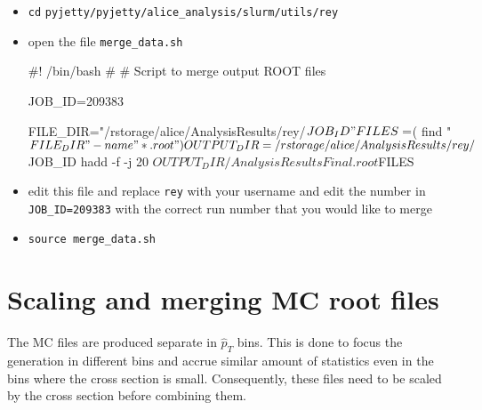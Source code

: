 \documentclass[12pt]{article}
\begin{document}
\begin{itemize}
\item \verb|cd| \verb|pyjetty/pyjetty/alice_analysis/slurm/utils/rey|
\item open the file \verb|merge_data.sh|

\begin{tcolorbox}
\begin{verbnobox}[\scriptsize]
#! /bin/bash
#
# Script to merge output ROOT files

JOB_ID=209383

FILE_DIR="/rstorage/alice/AnalysisResults/rey/$JOB_ID"
FILES=$( find "$FILE_DIR" -name "*.root" )

OUTPUT_DIR=/rstorage/alice/AnalysisResults/rey/$JOB_ID
hadd -f -j 20 $OUTPUT_DIR/AnalysisResultsFinal.root $FILES
\end{verbnobox}  
\end{tcolorbox}

\item edit this file and replace \verb|rey| with your username and edit the number in \verb|JOB_ID=209383| with the correct run number that you would like to merge
\item \verb|source merge_data.sh|
\end{itemize}

\section{Scaling and merging MC root files}
\label{sec:scale_merge}

The MC files are produced separate in $\hat{p}_T$ bins. This is done to focus the generation in different bins
and accrue similar amount of statistics even in the bins where the cross section is small. Consequently, these files need to be scaled by the cross section
before combining them.
\end{document}
